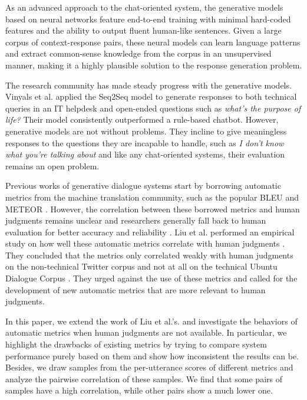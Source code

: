 \documentclass[runningheads]{llncs}
\begin{document}
    As an advanced approach to the chat-oriented system, the generative models based on neural networks feature end-to-end training with minimal hard-coded features and the ability to output fluent human-like sentences. Given a large corpus of context-response pairs, these neural models can learn language patterns and extract common-sense knowledge from the corpus in an unsupervised manner, making it a highly plausible solution to the response generation problem.

    The research community has made steady progress with the generative models. Vinyals et al. \cite{GoogleChatbot} applied the Seq2Seq model \cite{Seq2Seq} to generate responses to both technical queries in an IT helpdesk and open-ended questions such as \textit{what's the purpose of life?} Their model consistently outperformed a rule-based chatbot. However, generative models are not without problems. They incline to give meaningless responses to the questions they are incapable to handle, such as \textit{I don't know what you're talking about} and like any chat-oriented systems, their evaluation remains an open problem.

    Previous works of generative dialogue systems start by borrowing automatic metrics from the machine translation community, such as the popular BLEU \cite{BLEU} and METEOR \cite{METEOR}. However, the correlation between these borrowed metrics and human judgments remains unclear and researchers generally fall back to human evaluation for better accuracy and reliability \cite{Shang,DCGM,VHRED}. Liu et al. performed an empirical study on how well these automatic metrics correlate with human judgments \cite{HowNot}. They concluded that the metrics only correlated weakly with human judgments on the non-technical Twitter corpus and not at all on the technical Ubuntu Dialogue Corpus \cite{ubuntu_corpus}. They urged against the use of these metrics and called for the development of new automatic metrics that are more relevant to human judgments.

    In this paper, we extend the work of Liu et al.'s. and investigate the behaviors of automatic metrics when human judgments are not available. In particular, we highlight the drawbacks of existing metrics by trying to compare system performance purely based on them and show how inconsistent the results can be. Besides, we draw samples from the per-utterance scores of different metrics and analyze the pairwise correlation of these samples. We find that some pairs of samples have a high correlation, while other pairs show a much lower one.
\end{document}

